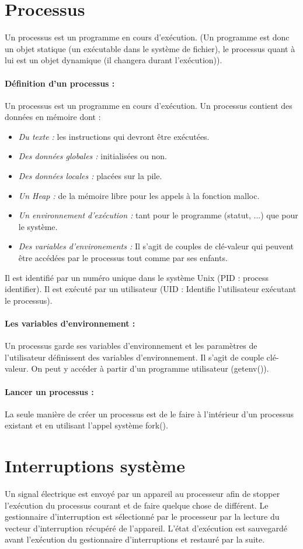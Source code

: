 \documentclass{article}[12pt]
\begin{document}
\section{Processus}
Un processus est un programme en cours d'exécution. (Un programme est donc un objet statique (un exécutable dans le système de fichier), le processus quant à lui est un objet dynamique (il changera durant l'exécution)).
\paragraph{Définition d'un processus : } Un processus est un programme en cours d'exécution. Un processus contient des données en mémoire dont :
\begin{itemize}
	\item \emph{Du texte : } les instructions qui devront être exécutées.
	\item \emph{Des données globales : } initialisées ou non.
	\item \emph{Des données locales : } placées sur la pile.
	\item \emph{Un Heap : } de la mémoire libre pour les appels à la fonction malloc.
	\item \emph{Un environnement d'exécution :} tant pour le programme (statut, ...) que pour le système.
	\item \emph{Des variables d'environements : } Il s'agit de couples de clé-valeur qui peuvent être accédées par le processus tout comme par ses enfants.
\end{itemize}
Il est identifié par un numéro unique dans le système Unix (PID : process identifier). Il est exécuté par un utilisateur (UID : Identifie l'utilisateur exécutant le processus). 
\paragraph{Les variables d'environnement : } Un processus garde ses variables d'environnement et les paramètres de l'utilisateur définissent des variables d'environnement. Il s'agit de couple clé-valeur. On peut y accéder à partir d'un programme utilisateur (getenv()).
\paragraph{Lancer un processus : } La seule manière de créer un processus est de le faire à l'intérieur d'un processus existant et en utilisant l'appel système fork().
\section{Interruptions système}
Un signal électrique est envoyé par un appareil au processeur afin de stopper l'exécution du processus courant et de faire quelque chose de différent. Le gestionnaire d'interruption est sélectionné par le processeur par la lecture du vecteur d'interruption récupéré de l'appareil. L'état d'exécution est sauvegardé avant l'exécution du gestionnaire d'interruptions et restauré par la suite.
\end{document}
